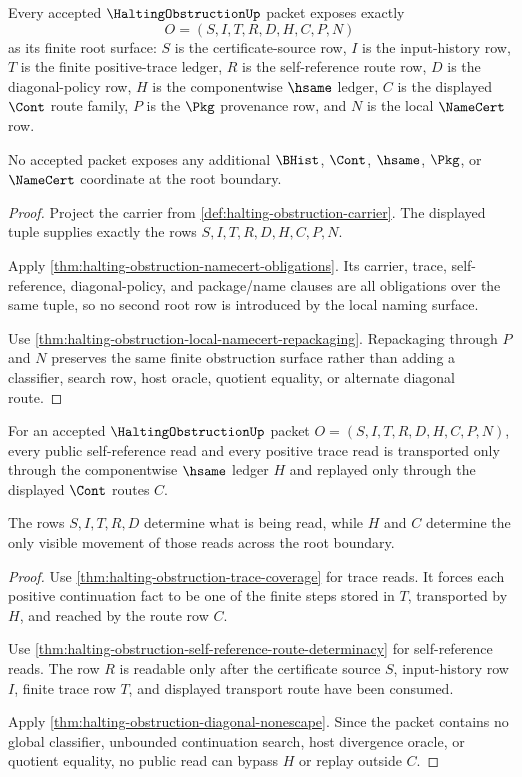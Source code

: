 \begin{theorem}
\label{thm:halting-obstruction-root-carrier-admission}
Every accepted $\HaltingObstructionUp$ packet exposes exactly
$$
O=(S,I,T,R,D,H,C,P,N)
$$
as its finite root surface: $S$ is the certificate-source row, $I$ is the
input-history row, $T$ is the finite positive-trace ledger, $R$ is the
self-reference route row, $D$ is the diagonal-policy row, $H$ is the
componentwise $\hsame$ ledger, $C$ is the displayed $\Cont$ route family, $P$
is the $\Pkg$ provenance row, and $N$ is the local $\NameCert$ row.

No accepted packet exposes any additional $\BHist$, $\Cont$, $\hsame$,
$\Pkg$, or $\NameCert$ coordinate at the root boundary.
\end{theorem}
\begin{proof}
Project the carrier from \autoref{def:halting-obstruction-carrier}. The
displayed tuple supplies exactly the rows $S,I,T,R,D,H,C,P,N$.

Apply \autoref{thm:halting-obstruction-namecert-obligations}. Its carrier,
trace, self-reference, diagonal-policy, and package/name clauses are all
obligations over the same tuple, so no second root row is introduced by the
local naming surface.

Use \autoref{thm:halting-obstruction-local-namecert-repackaging}. Repackaging
through $P$ and $N$ preserves the same finite obstruction surface rather than
adding a classifier, search row, host oracle, quotient equality, or alternate
diagonal route.
\end{proof}

\begin{theorem}
\label{thm:halting-obstruction-root-transport-scope}
For an accepted $\HaltingObstructionUp$ packet $O=(S,I,T,R,D,H,C,P,N)$, every
public self-reference read and every positive trace read is transported only
through the componentwise $\hsame$ ledger $H$ and replayed only through the
displayed $\Cont$ routes $C$.

The rows $S,I,T,R,D$ determine what is being read, while $H$ and $C$ determine
the only visible movement of those reads across the root boundary.
\end{theorem}
\begin{proof}
Use \autoref{thm:halting-obstruction-trace-coverage} for trace reads. It
forces each positive continuation fact to be one of the finite steps stored in
$T$, transported by $H$, and reached by the route row $C$.

Use \autoref{thm:halting-obstruction-self-reference-route-determinacy} for
self-reference reads. The row $R$ is readable only after the certificate source
$S$, input-history row $I$, finite trace row $T$, and displayed transport
route have been consumed.

Apply \autoref{thm:halting-obstruction-diagonal-nonescape}. Since the packet
contains no global classifier, unbounded continuation search, host divergence
oracle, or quotient equality, no public read can bypass $H$ or replay outside
$C$.
\end{proof}

